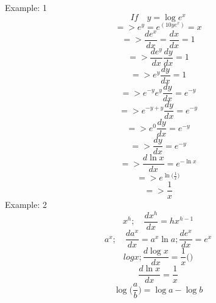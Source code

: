	Example: 1
	\begin{displaymath}
	If \quad y = \log e^x
	\end{displaymath}
	\begin{displaymath}
	=> e^y=e^{(10ye^x)} = x
	\end{displaymath}
	\begin{displaymath}
	=> \frac{de^x}{dx} = \frac{dx}{dx} = 1
	\end{displaymath}
	\begin{displaymath}
	=>\frac{de^y}{dx} \frac{dy}{dx} = 1
	\end{displaymath}
	\begin{displaymath}
	=>e^y \frac{dy}{dx} = 1
	\end{displaymath}
	\begin{displaymath}
	=>e^{-y}e^y\frac{dy}{dx} = e^{-y}
	\end{displaymath}
	\begin{displaymath}
	=>e^{-y+y}\frac{dy}{dx} = e^{-y}
	\end{displaymath}
	\begin{displaymath}
	=>e^0\frac{dy}{dx} = e^{-y}
	\end{displaymath}
	\begin{displaymath}
	=>\frac{dy}{dx} = e^{-y}
	\end{displaymath}
	\begin{displaymath}
	=> \frac{d\ln x}{dx} = e^{-\ln x}
	\end{displaymath}
	\begin{displaymath}
	=> e^{\ln\big(\frac{1}{x}\big)}
	\end{displaymath}
	\begin{displaymath}
	=> \frac{1}{x}
	\end{displaymath}
	\newline
	Example: 2
	\begin{equation}
	x^h ;\quad \frac{dx^h}{dx} = hx^{h-1}
	\end{equation}
	\begin{equation}
	a^x; \quad \frac{da^x}{dx} = a^x\ln a;\frac{de^x}{dx} = e^x
	\end{equation}
	\begin{equation}
	log x; \frac{d\log x}{dx} = \frac{1}{x}\bigg(\bigg)
	\end{equation}
	\begin{equation}
	\frac{d\ln x}{dx} = \frac{1}{x}
	\end{equation}
	\newline
	\begin{equation}
	\log\bigg(\frac{a}{b}\bigg) = \log a - \log b
	\end{equation}
